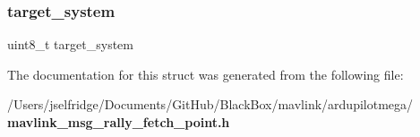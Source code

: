 \mbox{\label{struct____mavlink__rally__fetch__point__t_ac9afff43526a157e4c4e45607c1418b8}} 
\subsubsection{target\+\_\+system}
{\footnotesize\ttfamily uint8\+\_\+t target\+\_\+system}



The documentation for this struct was generated from the following file\+:\begin{DoxyCompactItemize}
\item 
/\+Users/jselfridge/\+Documents/\+Git\+Hub/\+Black\+Box/mavlink/ardupilotmega/\textbf{ mavlink\+\_\+msg\+\_\+rally\+\_\+fetch\+\_\+point.\+h}\end{DoxyCompactItemize}
